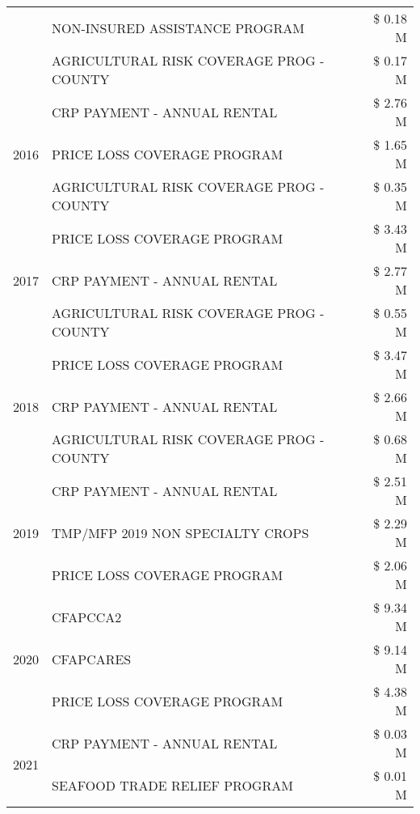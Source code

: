 \begin{tabular}{llr}
 & NON-INSURED ASSISTANCE PROGRAM & \$ 0.18 M \\
 & AGRICULTURAL RISK COVERAGE PROG - COUNTY & \$ 0.17 M \\
\cline{1-3}
\multirow[t]{3}{*}{2016} & CRP PAYMENT - ANNUAL RENTAL                   & \$ 2.76 M \\
 & PRICE LOSS COVERAGE PROGRAM                   & \$ 1.65 M \\
 & AGRICULTURAL RISK COVERAGE PROG - COUNTY      & \$ 0.35 M \\
\cline{1-3}
\multirow[t]{3}{*}{2017} & PRICE LOSS COVERAGE PROGRAM & \$ 3.43 M \\
 & CRP PAYMENT - ANNUAL RENTAL & \$ 2.77 M \\
 & AGRICULTURAL RISK COVERAGE PROG - COUNTY & \$ 0.55 M \\
\cline{1-3}
\multirow[t]{3}{*}{2018} & PRICE LOSS COVERAGE PROGRAM & \$ 3.47 M \\
 & CRP PAYMENT - ANNUAL RENTAL & \$ 2.66 M \\
 & AGRICULTURAL RISK COVERAGE PROG - COUNTY & \$ 0.68 M \\
\cline{1-3}
\multirow[t]{3}{*}{2019} & CRP PAYMENT - ANNUAL RENTAL & \$ 2.51 M \\
 & TMP/MFP 2019 NON SPECIALTY CROPS & \$ 2.29 M \\
 & PRICE LOSS COVERAGE PROGRAM & \$ 2.06 M \\
\cline{1-3}
\multirow[t]{3}{*}{2020} & CFAPCCA2 & \$ 9.34 M \\
 & CFAPCARES & \$ 9.14 M \\
 & PRICE LOSS COVERAGE PROGRAM & \$ 4.38 M \\
\cline{1-3}
\multirow[t]{2}{*}{2021} & CRP PAYMENT - ANNUAL RENTAL & \$ 0.03 M \\
 & SEAFOOD TRADE RELIEF PROGRAM & \$ 0.01 M \\
\cline{1-3}
\bottomrule
\end{tabular}
